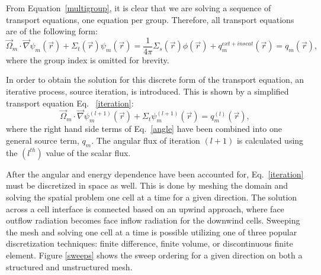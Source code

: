 \documentclass[11pt, letterpaper,titlepage,oneside]{article}
\newcommand{\vr}{\vec{r}}
\newcommand{\vo}{\vec{\Omega}}
\begin{document}
From Equation~\eqref{multigroup}, it is clear that we are solving a sequence of transport equations, one equation per group. Therefore, all transport equations are of the following form:
\begin{equation}
\vo_m \cdot \vec \nabla \psi_{m}(\vr) +\Sigma_{t}(\vr) \psi_{m}(\vr)  = \frac{1}{4\pi}\Sigma_{s}(\vr)\phi(\vr) + q^{ext+inscat}_m(\vr) = q_m(\vr),
\end{equation}
where the group index is omitted for brevity.

In order to obtain the solution for this discrete form of the transport equation, an iterative process, source iteration, is introduced. This is shown by a simplified transport equation Eq. ~\eqref{iteration}:
\begin{equation}
\vo_m \cdot \vec\nabla \psi_m^{(l+1)}(\vr) + \Sigma_t \psi_m^{(l+1)}(\vr) = q_m^{(l)}(\vr),
\label{iteration}
\end{equation}
where the right hand side terms of Eq.~\eqref{angle} have been combined into one general source term, $q_m$. The angular flux of iteration $(l+1)$ is calculated using the $(l^{th})$ value of the scalar flux.

After the angular and energy dependence have been accounted for, Eq.~\eqref{iteration} must be discretized in space as well. This is done by meshing the domain and solving the spatial problem one cell at a time for a given direction. The solution across a cell interface is connected based on an upwind approach, where face outflow radiation becomes face inflow radiation for the downwind cells. Sweeping the mesh and solving one cell at a time is possible utilizing one of three popular discretization techniques: finite difference\cite{fd}, finite volume\cite{fd}, or discontinuous finite element\cite{Reed}. Figure \ref{sweeps} shows the sweep ordering for a given direction on both a structured and unstructured mesh.
\end{document}

